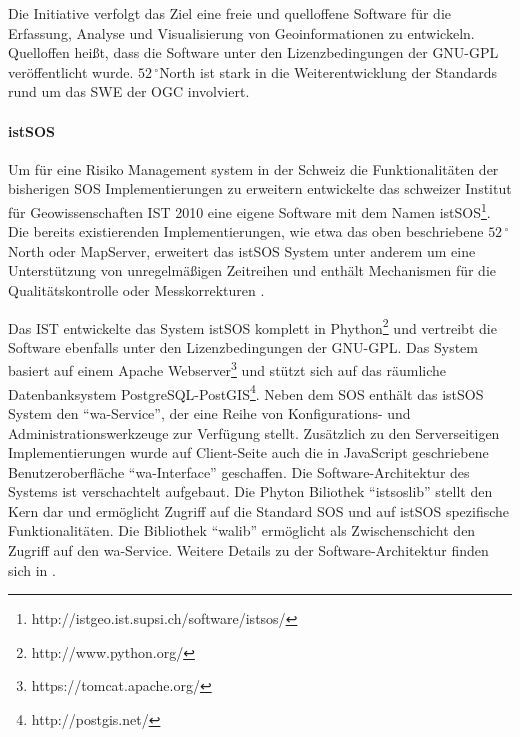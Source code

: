 Die Initiative verfolgt das Ziel eine freie und quelloffene Software für die Erfassung, Analyse und Visualisierung von Geoinformationen zu entwickeln. Quelloffen heißt, dass die Software unter den Lizenzbedingungen der \gls{GNU-GPL} veröffentlicht wurde. $52\,^{\circ}$North ist stark in die Weiterentwicklung der Standards rund um das \gls{SWE} der \gls{OGC} involviert.


\paragraph{istSOS}
Um für eine Risiko Management system in der Schweiz die Funktionalitäten der bisherigen \gls{SOS} Implementierungen zu erweitern entwickelte das schweizer Institut für Geowissenschaften \gls{IST} 2010 eine eigene Software mit dem Namen \gls{istSOS}\footnote{http://istgeo.ist.supsi.ch/software/istsos/}. Die bereits existierenden Implementierungen, wie etwa das oben beschriebene $52\,^{\circ}$North  oder MapServer, erweitert das \gls{istSOS} System unter anderem um eine Unterstützung von unregelmäßigen Zeitreihen und enthält Mechanismen für die Qualitätskontrolle oder Messkorrekturen \citep{cannata_istsos_2013}. 

Das \gls{IST} entwickelte das System \gls{istSOS} komplett in Phython\footnote{http://www.python.org/} und vertreibt die Software ebenfalls unter den Lizenzbedingungen der \gls{GNU-GPL}. Das System basiert auf einem Apache Webserver\footnote{https://tomcat.apache.org/} und stützt sich auf das räumliche Datenbanksystem PostgreSQL-PostGIS\footnote{http://postgis.net/}. Neben dem \gls{SOS} enthält das \gls{istSOS} System den ``wa-Service'', der eine Reihe von Konfigurations- und Administrationswerkzeuge zur Verfügung stellt. Zusätzlich zu den Serverseitigen Implementierungen wurde auf Client-Seite auch die in JavaScript geschriebene Benutzeroberfläche ``wa-Interface'' geschaffen. Die Software-Architektur des Systems ist verschachtelt aufgebaut. Die Phyton Biliothek ``istsoslib'' stellt den Kern dar und ermöglicht Zugriff auf die Standard \gls{SOS} und auf \gls{istSOS} spezifische Funktionalitäten. Die Bibliothek ``walib'' ermöglicht als Zwischenschicht den Zugriff auf den wa-Service. Weitere Details zu der Software-Architektur finden sich in \citep{cannata_istsos_2013}\citep{cannata_istsos:_2010}.

